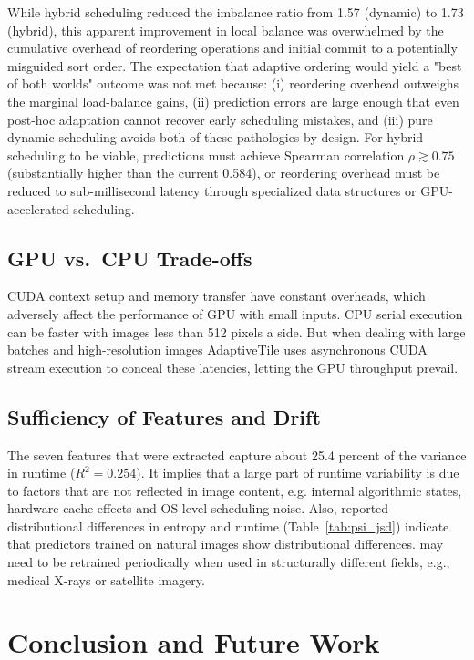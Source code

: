 \documentclass[acmsmall]{acmart}
\begin{document}
While hybrid scheduling reduced the imbalance ratio from 1.57 (dynamic) to 1.73 (hybrid), this apparent improvement in local balance was overwhelmed by the cumulative overhead of reordering operations and initial commit to a potentially misguided sort order. 
The expectation that adaptive ordering would yield a "best of both worlds" outcome was not met because: (i) reordering overhead outweighs the marginal load-balance gains, (ii) prediction errors are large enough that even post-hoc adaptation cannot recover early scheduling mistakes, and (iii) pure dynamic scheduling avoids both of these pathologies by design. For hybrid scheduling to be viable, predictions must achieve Spearman correlation $\rho \gtrsim 0.75$ (substantially higher than the current 0.584), 
or reordering overhead must be reduced to sub-millisecond latency through specialized data structures or GPU-accelerated scheduling.

\subsection{GPU vs.\ CPU Trade-offs}

CUDA context setup and memory transfer have constant overheads, which adversely affect the performance of GPU with small inputs. 
CPU serial execution can be faster with images less than 512 pixels a side. 
But when dealing with large batches and high-resolution images AdaptiveTile uses asynchronous CUDA stream execution to conceal these latencies, 
letting the GPU throughput prevail.

\subsection{Sufficiency of Features and Drift}

The seven features that were extracted capture about 25.4 percent of the variance in runtime ($R^2 = 0.254$). 
It implies that a large part of runtime variability is due to factors that are not reflected in image content, 
e.g. internal algorithmic states, hardware cache effects and OS-level scheduling noise. 
Also, reported distributional differences in entropy and runtime (Table~\ref{tab:psi_jsd}) indicate that predictors trained on natural images show distributional differences. 
may need to be retrained periodically when used in structurally different fields, e.g., medical X-rays or satellite imagery.

\section{Conclusion and Future Work}
\end{document}
